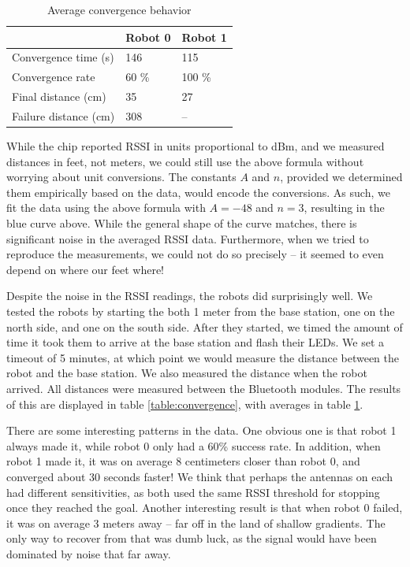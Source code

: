 \documentclass[]{article}
\newcommand{\ra}[1]{\renewcommand{\arraystretch}{#1}}
\begin{document}
\begin{table}[]
\centering
\ra{1.3}
\caption{Average convergence behavior}
\label{table:averagecon}
\begin{tabular}{@{}lll@{}}
\toprule
                       & Robot 0        & Robot 1     \\ \midrule
Convergence time (s)   & 146            & 115         \\
Convergence rate       & 60 \%          & 100 \%      \\
Final distance (cm)    & 35             & 27          \\
Failure distance (cm)  & 308            & --          \\ \bottomrule
\end{tabular}
\end{table}

While the chip reported RSSI in units proportional to dBm, and we
measured distances in feet, not meters, we could still use the above
formula without worrying about unit conversions. The constants $A$ and
$n$, provided we determined them empirically based on the data, would
encode the conversions. As such, we fit the data using the above formula
with $A=-48$ and $n=3$, resulting in the blue curve above. While the
general shape of the curve matches, there is significant noise in the
averaged RSSI data. Furthermore, when we tried to reproduce the
measurements, we could not do so precisely -- it seemed to even depend
on where our feet where!

Despite the noise in the RSSI readings, the robots did surprisingly well.
We tested the robots by starting the both 1 meter from the base station,
one on the north side, and one on the south side.
After they started, we timed the amount of time it took them to arrive
at the base station and flash their LEDs.
We set a timeout of 5 minutes, at which point we would measure the
distance between the robot and the base station.
We also measured the distance when the robot arrived.
All distances were measured between the Bluetooth modules.
The results of this are displayed in table \ref{table:convergence},
with averages in table \ref{table:averagecon}.

There are some interesting patterns in the data.
One obvious one is that robot 1 always made it,
while robot 0 only had a 60\% success rate.
In addition, when robot 1 made it, it was on average 8 centimeters
closer than robot 0, and converged about 30 seconds faster!
We think that perhaps the antennas on each had different sensitivities,
as both used the same RSSI threshold for stopping once they reached the goal.
Another interesting result is that when robot 0 failed, it was
on average 3 meters away -- far off in the land of shallow gradients.
The only way to recover from that was dumb luck, as the signal would have been
dominated by noise that far away.
\end{document}
